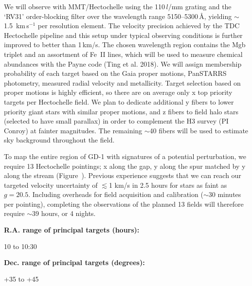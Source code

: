 \documentclass[12pt]{article}
\begin{document}
We will observe with MMT/Hectochelle using the 110\,$l$/mm grating and the `RV31' order-blocking filter over the wavelength range 5150--5300\,\AA, yielding $\sim$1.5~km\,s$^{-1}$ per resolution element.
The velocity precision achieved by the TDC Hectochelle pipeline and this setup under typical observing conditions is further improved to better than 1\,km/s.
The chosen wavelength region contains the Mgb triplet and an assortment of Fe~II lines, which will be used to measure chemical abundances with the Payne code (Ting et al. 2018).
We will assign membership probability of each target based on the Gaia proper motions, PanSTARRS photometry, measured radial velocity and metallicity.
Target selection based on proper motions is highly efficient, so there are on average only x top priority targets per Hectochelle field.
We plan to dedicate additional y fibers to lower priority giant stars with similar proper motions, and z fibers to field halo stars (selected to have small parallax) in order to complement the H3 survey (PI Conroy) at fainter magnitudes.
The remaining $\sim$40 fibers will be used to estimate sky background throughout the field.

To map the entire region of GD-1 with signatures of a potential perturbation, we require 13 Hectochelle pointings; x along the gap, y along the spur matched by y along the stream (Figure~).
Previous experience suggests that we can reach our targeted velocity uncertainty of $\lesssim$1 km/s in 2.5 hours for stars as faint as $g=20.5$.
Including overheads for field acquisition and calibration ($\sim$30 minutes per pointing), completing the observations of the planned 13 fields will therefore require $\sim$39 hours, or 4 nights.

{\par\bf R.A. range of principal targets (hours): }10 to 10:30
{\par\bf Dec. range of principal targets (degrees): }+35 to +45

\pagebreak
\end{document}
